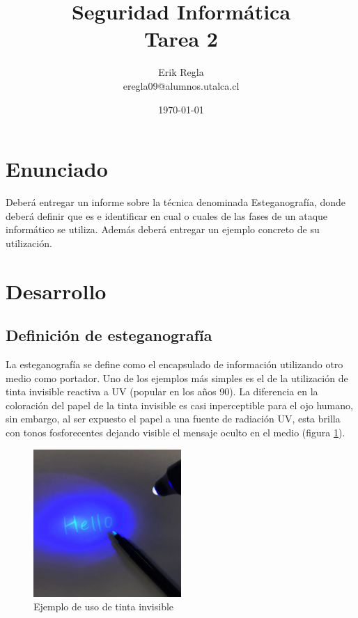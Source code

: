 \documentclass[11pt]{utalcaDoc}
\title{{\bf Seguridad Informática}\\ Tarea 2}
\author{Erik Regla\\ eregla09@alumnos.utalca.cl}
\date{\today}
\begin{document}
\maketitle

\section{Enunciado}
Deberá entregar un informe sobre la técnica denominada Esteganografía, donde
deberá definir que es e identificar en cual o cuales de las fases de un ataque
informático se utiliza. Además deberá entregar un ejemplo concreto de su
utilización.

\section{Desarrollo}

\subsection{ Definición de esteganografía }
La esteganografía se define como el encapsulado de información utilizando otro medio como portador. Uno de los ejemplos más simples es el de la utilización de tinta invisible reactiva a UV (popular en los años 90). La diferencia en la coloración del papel de la tinta invisible es casi inperceptible para el ojo humano, sin embargo, al ser expuesto el papel a una fuente de radiación UV, esta brilla con tonos fosforecentes dejando visible el mensaje oculto en el medio (figura \ref{INVISIBLE_INK}).

\begin{figure}[]
    \centering
    \includegraphics[width=0.5\textwidth]{invisibleink.png}
    \caption{Ejemplo de uso de tinta invisible}
    \label{INVISIBLE_INK}
\end{figure}
\end{document}
